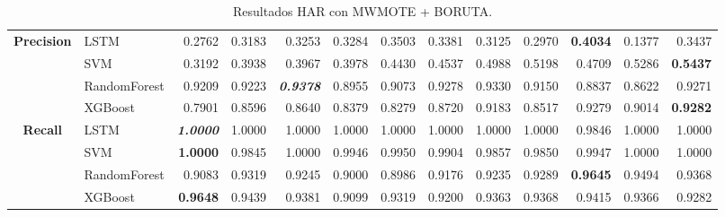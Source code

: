 \begin{table}[H]
\begin{adjustbox}{max width=12cm}
\begin{tabular}{|c|l|r|r|r|r|r|r|r|r|r|r|r|}
			\hline
			\textbf{Precision} &  LSTM &  0.2762 &  0.3183 &  0.3253 &  0.3284 &  0.3503 &  0.3381 &  0.3125 &  0.2970 & \textbf{  0.4034 } &  0.1377 &  0.3437 \\
			&  SVM &  0.3192 &  0.3938 &  0.3967 &  0.3978 &  0.4430 &  0.4537 &  0.4988 &  0.5198 &  0.4709 &  0.5286 & \textbf{  0.5437 } \\
			&  RandomForest &  0.9209 &  0.9223 & \textit{ \textbf{  0.9378 } } &  0.8955 &  0.9073 &  0.9278 &  0.9330 &  0.9150 &  0.8837 &  0.8622 &  0.9271 \\
			&  XGBoost &  0.7901 &  0.8596 &  0.8640 &  0.8379 &  0.8279 &  0.8720 &  0.9183 &  0.8517 &  0.9279 &  0.9014 & \textbf{  0.9282 } \\
			\hline
			\textbf{Recall} &  LSTM & \textit{ \textbf{  1.0000 } } &  1.0000 &  1.0000 &  1.0000 &  1.0000 &  1.0000 &  1.0000 &  1.0000 &  0.9846 &  1.0000 &  1.0000 \\
			&  SVM & \textbf{  1.0000 } &  0.9845 &  1.0000 &  0.9946 &  0.9950 &  0.9904 &  0.9857 &  0.9850 &  0.9947 &  1.0000 &  1.0000 \\
			&  RandomForest &  0.9083 &  0.9319 &  0.9245 &  0.9000 &  0.8986 &  0.9176 &  0.9235 &  0.9289 & \textbf{  0.9645 } &  0.9494 &  0.9368 \\
			&  XGBoost & \textbf{  0.9648 } &  0.9439 &  0.9381 &  0.9099 &  0.9319 &  0.9200 &  0.9363 &  0.9368 &  0.9415 &  0.9366 &  0.9282 \\
			\hline
		\end{tabular}
	\end{adjustbox}
	\caption{Resultados HAR con MWMOTE + BORUTA.}
	\label{tab:HAR_MWMOTE_BORUTA}
\end{table}
